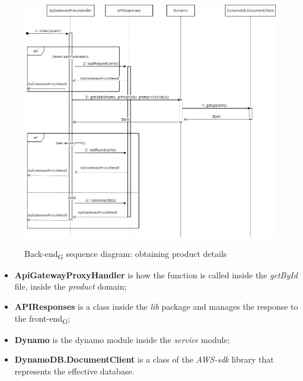 \begin{figure}[H]
\centering
\includegraphics[scale=0.45]{res/Architettura/Backend/img/diagrammaSequenzaRicezioneProdotto}\\
\caption{Back-end\textsubscript{G} sequence diagram: obtaining product details}
\end{figure}

\begin{itemize}
\item \textbf{ApiGatewayProxyHandler} is how the function is called inside the \textit{getById} file, inside the \textit{product} domain;
\item \textbf{APIResponses} is a class inside the \textit{lib} package and manages the response to the front-end\textsubscript{G};
\item \textbf{Dynamo} is the dynamo module inside the \textit{service} module;
\item \textbf{DynamoDB.DocumentClient} is a class of the \textit{AWS-sdk} library that represents the effective database.

\end{itemize}



